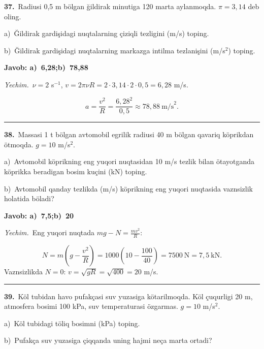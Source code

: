 \documentclass[11pt,a4paper]{article}
\begin{document}
\noindent\textbf{37.}\ Radiusi 0,5 m bölgan ğildirak minutiga 120 marta aylanmoqda. $\pi=3{,}14$ deb oling.\par
\noindent\hspace*{4mm}a)\ Ğildirak gardişidagi nuqtalarning çiziqli tezligini (m/s) toping.\par
\noindent\hspace*{4mm}b)\ Ğildirak gardişidagi nuqtalarning markazga intilma tezlanişini (m/s$^2$) toping.\par
\noindent\colorbox{gray!12}{\parbox{\dimexpr\linewidth-2\fboxsep}{\textbf{Javob: a)\ 6,28;\quad b)\ 78,88}}}\par\smallskip
\noindent\textit{Yechim.}\ $\nu=2$ s$^{-1}$, $v=2\pi\nu R=2\cdot3{,}14\cdot2\cdot0{,}5=6{,}28$ m/s.\par
\[a=\frac{v^2}{R}=\frac{6{,}28^2}{0{,}5}\approx78{,}88\ \text{m/s}^2.\]\par\medskip\hrule\medskip
{}\noindent\textbf{38.}\ Massasi 1 t bölgan avtomobil egrilik radiusi 40 m bölgan qavariq köprikdan ötmoqda. $g=10$ m/s$^2$.\par
\noindent\hspace*{4mm}a)\ Avtomobil köprikning eng yuqori nuqtasidan 10 m/s tezlik bilan ötayotganda köprikka beradigan bosim kuçini (kN) toping.\par
\noindent\hspace*{4mm}b)\ Avtomobil qanday tezlikda (m/s) köprikning eng yuqori nuqtasida vaznsizlik holatida böladi?\par
\noindent\colorbox{gray!12}{\parbox{\dimexpr\linewidth-2\fboxsep}{\textbf{Javob: a)\ 7,5;\quad b)\ 20}}}\par\smallskip
\noindent\textit{Yechim.}\ Eng yuqori nuqtada $mg-N=\frac{mv^2}{R}$:\par
\[N=m\left(g-\frac{v^2}{R}\right)=1000\left(10-\frac{100}{40}\right)=7500\ \text{N}=7{,}5\ \text{kN}.\]
Vaznsizlikda $N=0$: $v=\sqrt{gR}=\sqrt{400}=20$ m/s.\par\par\medskip\hrule\medskip
{}\noindent\textbf{39.}\ Köl tubidan havo pufakçasi suv yuzasiga kötarilmoqda. Köl çuqurligi 20 m, atmosfera bosimi 100 kPa, suv temperaturasi özgarmas. $g=10$ m/s$^2$.\par
\noindent\hspace*{4mm}a)\ Köl tubidagi töliq bosimni (kPa) toping.\par
\noindent\hspace*{4mm}b)\ Pufakça suv yuzasiga çiqqanda uning hajmi neça marta ortadi?\par
\end{document}
